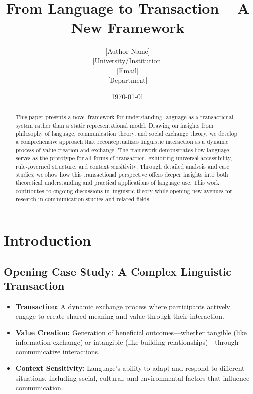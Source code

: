 \documentclass[12pt]{article}
\title{\Large\textbf{From Language to Transaction -- A New Framework}}
\author{[Author Name]\\
        \small{[University/Institution]}\\
        \small{[Email]}\\
        \small{[Department]}
}
\date{\today}
\begin{document}
\maketitle

\begin{abstract}
This paper presents a novel framework for understanding language as a transactional system rather than a static representational model. Drawing on insights from philosophy of language, communication theory, and social exchange theory, we develop a comprehensive approach that reconceptualizes linguistic interaction as a dynamic process of value creation and exchange. The framework demonstrates how language serves as the prototype for all forms of transaction, exhibiting universal accessibility, rule-governed structure, and context sensitivity. Through detailed analysis and case studies, we show how this transactional perspective offers deeper insights into both theoretical understanding and practical applications of language use. This work contributes to ongoing discussions in linguistic theory while opening new avenues for research in communication studies and related fields.
\end{abstract}

\section{Introduction}

\subsection{Opening Case Study: A Complex Linguistic Transaction}

\begin{tcolorbox}[keyconceptbox]
\begin{itemize}[label=$\bullet$]
\item \textbf{Transaction:} A dynamic exchange process where participants actively engage to create shared meaning and value through their interaction.
\item \textbf{Value Creation:} Generation of beneficial outcomes---whether tangible (like information exchange) or intangible (like building relationships)---through communicative interactions.
\item \textbf{Context Sensitivity:} Language's ability to adapt and respond to different situations, including social, cultural, and environmental factors that influence communication.
\end{itemize}
\end{tcolorbox}
\end{document}

